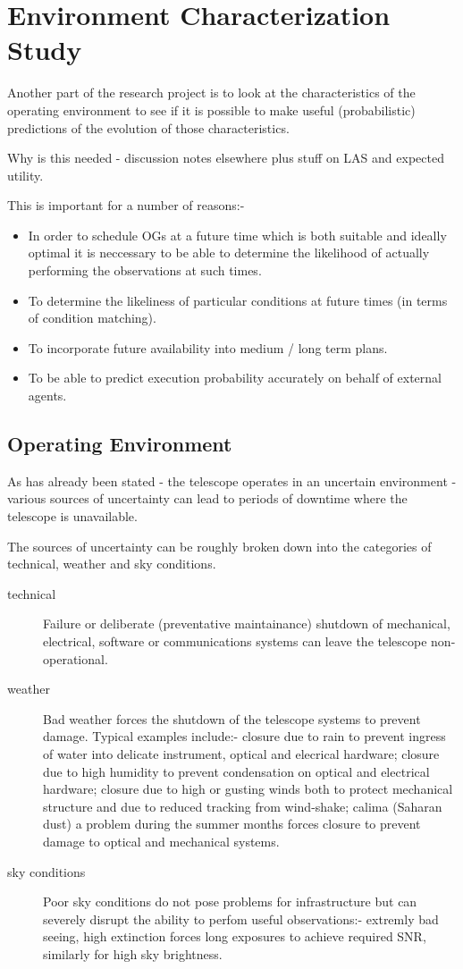 \section{Environment Characterization Study}
\label{sect:prediction}
Another part of the research project is to look at the characteristics of the operating environment to see if it is possible to make useful (probabilistic) predictions of the evolution of those characteristics.

Why is this needed - discussion notes elsewhere plus stuff on LAS and expected utility.

This is important for a number of reasons:-
\begin{itemize}
\item In order to schedule OGs at a future time which is both suitable and ideally optimal it is neccessary to be able to determine the likelihood of actually performing the observations at such times.
\item To determine the likeliness of particular conditions at future times (in terms of condition matching).
\item To incorporate future availability into medium / long term plans.
\item To be able to predict execution probability accurately on behalf of external agents.
\end{itemize}

\subsection{Operating Environment}

As has already been stated - the telescope operates in an uncertain environment - various sources of uncertainty can lead to periods of downtime where the telescope is unavailable.


The sources of uncertainty can be roughly broken down into the categories of technical, weather and sky conditions.
\begin{description}
\item [technical] Failure or deliberate (preventative maintainance) shutdown of mechanical, electrical, software or communications systems can leave the telescope non-operational.
\item [weather] Bad weather forces the shutdown of the telescope systems to prevent damage. Typical examples include:- closure due to rain to prevent ingress of water into delicate instrument, optical and elecrical hardware; closure due to high humidity to prevent condensation on optical and electrical hardware; closure due to high or gusting winds both to protect mechanical structure and due to reduced tracking from wind-shake; calima (Saharan dust) a problem during the summer months forces closure to prevent damage to optical and mechanical systems.
\item [sky conditions] Poor sky conditions do not pose problems for infrastructure but can severely disrupt the ability to perfom useful observations:- extremly bad seeing, high extinction forces long exposures to achieve required SNR, similarly for high sky brightness.
\end{description}
  
